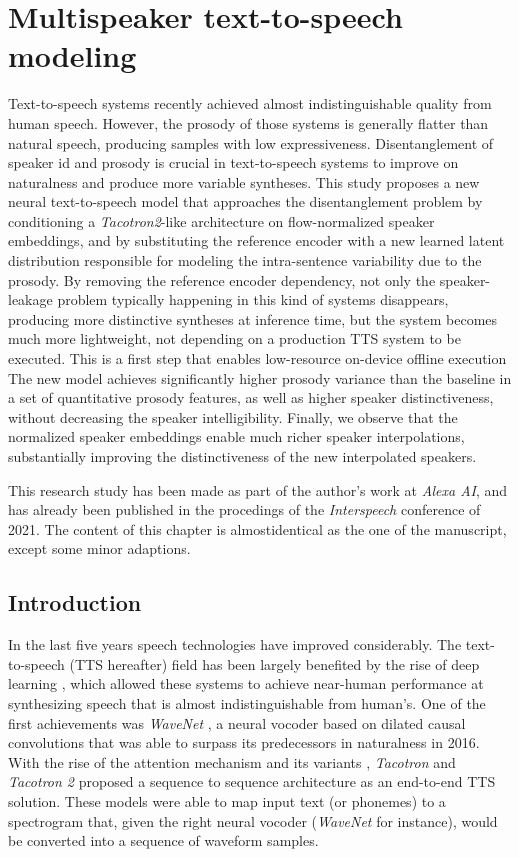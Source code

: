 \chapter{Multispeaker text-to-speech modeling} \label{ch:tts}

Text-to-speech systems recently achieved almost indistinguishable quality from human speech. However, the prosody of those systems is generally flatter than natural speech, producing samples with low expressiveness. Disentanglement of speaker id and prosody is crucial in text-to-speech systems to improve on naturalness and produce more variable syntheses. This study proposes a new neural text-to-speech model that approaches the disentanglement problem by conditioning a \textit{Tacotron2}-like architecture on flow-normalized speaker embeddings, and by substituting the reference encoder with a new learned latent distribution responsible for modeling the intra-sentence variability due to the prosody. By removing the reference encoder dependency, not only the speaker-leakage problem typically happening in this kind of systems disappears, producing more distinctive syntheses at inference time, but the system becomes much more lightweight, not depending on a production TTS system to be executed. This is a first step that enables low-resource on-device offline execution The new model achieves significantly higher prosody variance than the baseline in a set of quantitative prosody features, as well as higher speaker distinctiveness, without decreasing the speaker intelligibility. Finally, we observe that the normalized speaker embeddings enable much richer speaker interpolations, substantially improving the distinctiveness of the new interpolated speakers.

 This research study has been made as part of the author's work at \textit{Alexa AI}, and has already been published in the procedings of the \textit{Interspeech} conference of 2021. The content of this chapter is almostidentical as the one of the manuscript, except some minor adaptions.

\section{Introduction}
In the last five years speech technologies have improved considerably. The text-to-speech (TTS hereafter) field has been largely benefited by the rise of deep learning \cite{Sisman2021}, which allowed these systems to achieve near-human performance at synthesizing speech that is almost indistinguishable from human's. One of the first achievements was \textit{WaveNet} \cite{vanderoord2016}, a neural vocoder based on dilated causal convolutions that was able to surpass its predecessors in naturalness in 2016. With the rise of the attention mechanism and its variants \cite{bahdanau2015,vaswani2017,chaudhari2019}, \textit{Tacotron} \cite{Wang2017} and \textit{Tacotron 2} \cite{Shen2018,liu2019b} proposed a sequence to sequence architecture as an end-to-end TTS solution. These models were able to map input text (or phonemes) to a spectrogram that, given the right neural vocoder (\textit{WaveNet} for instance), would be converted into a sequence of waveform samples.

